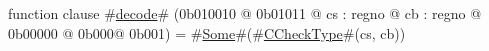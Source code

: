 function clause #\hyperref[zdecode]{decode}# (0b010010 @ 0b01011 @ cs : regno @ cb : regno @ 0b00000 @ 0b000@ 0b001) = #\hyperref[zSome]{Some}#(#\hyperref[zCCheckType]{CCheckType}#(cs, cb))
